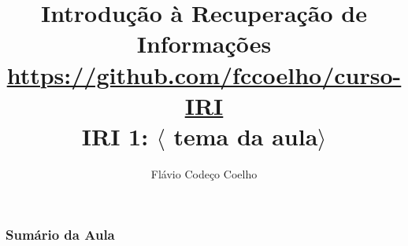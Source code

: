\documentclass[compress]{beamer}
\title[Coelho: $\langle$ tema da aula$\rangle$]
{Introdução à Recuperação de Informações\\
\large \url{https://github.com/fccoelho/curso-IRI}\\[0.5cm]
IRI 1: $\langle$ tema da aula$\rangle$}
\author [Coelho F.C. \& Souza R.R.]{ Flávio Codeço Coelho}
\institute [EMAp, FGV]{Escola de Matemática Aplicada,   Fundação Getúlio Vargas}
\date
\begin{document}
\begin{frame}
\titlepage
\end{frame}

\begin{frame}[fragile]
\frametitle{Sumário da Aula}
\tableofcontents
\end{frame}
\end{document}
